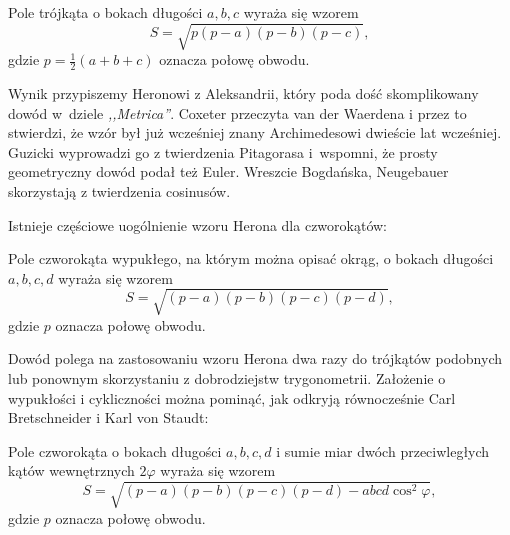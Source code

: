 %


\begin{proposition}
\label{prp_heron}%
    Pole trójkąta o bokach długości $a, b, c$ wyraża się wzorem
    \begin{equation}
        S = \sqrt{p(p-a)(p-b)(p-c)},
    \end{equation}
    gdzie $p = \frac 1 2 (a + b + c)$ oznacza połowę obwodu.
\end{proposition}

Wynik przypiszemy Heronowi z Aleksandrii, który poda dość skomplikowany dowód w~dziele \emph{,,Metrica''}.
%
Coxeter \cite[s. 12]{coxeter_1991} przeczyta van der Waerdena \cite[s. 228, 277]{waerden_1961} i przez to stwierdzi, że wzór był już wcześniej znany Archimedesowi dwieście lat wcześniej.
%
Guzicki \cite[s. 165-169]{guzicki_2021} wyprowadzi go z twierdzenia Pitagorasa i~wspomni, że prosty geometryczny dowód podał też Euler.
%
Wreszcie Bogdańska, Neugebauer \cite[s. 92]{neugebauer_2018} skorzystają z twierdzenia cosinusów.

Istnieje częściowe uogólnienie wzoru Herona dla czworokątów:

\begin{proposition}
    \label{brahmagupta_formula}%
    Pole czworokąta wypukłego, na którym można opisać okrąg, o bokach długości $a, b, c, d$ wyraża się wzorem
    \begin{equation}
        S = \sqrt{(p-a)(p-b)(p-c)(p-d)},
    \end{equation}
    gdzie $p$ oznacza połowę obwodu.
\end{proposition}
%

Dowód polega na zastosowaniu wzoru Herona dwa razy do trójkątów podobnych lub ponownym skorzystaniu z dobrodziejstw trygonometrii.
Założenie o wypukłości i cykliczności można pominąć, jak odkryją równocześnie Carl Bretschneider i Karl von Staudt:
%
%

\begin{proposition}
    Pole czworokąta o bokach długości $a, b, c, d$ i sumie miar dwóch przeciwległych kątów wewnętrznych $2 \varphi$ wyraża się wzorem
    \begin{equation}
        S = \sqrt{(p-a)(p-b)(p-c)(p-d) - abcd \cos^2  \varphi},
    \end{equation}
    gdzie $p$ oznacza połowę obwodu.
\end{proposition}
%

